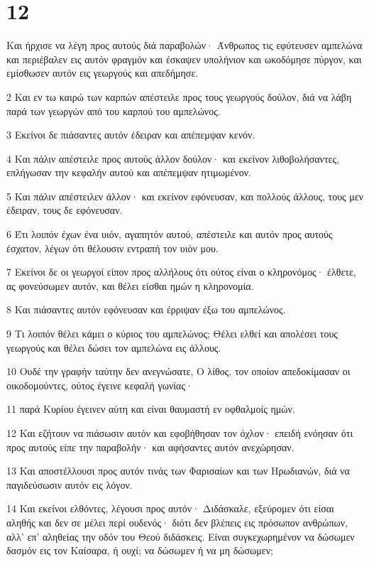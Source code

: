 \chapter{12}

\par Και ήρχισε να λέγη προς αυτούς διά παραβολών· Άνθρωπος τις εφύτευσεν αμπελώνα και περιέβαλεν εις αυτόν φραγμόν και έσκαψεν υπολήνιον και ωκοδόμησε πύργον, και εμίσθωσεν αυτόν εις γεωργούς και απεδήμησε.
\par 2 Και εν τω καιρώ των καρπών απέστειλε προς τους γεωργούς δούλον, διά να λάβη παρά των γεωργών από του καρπού του αμπελώνος.
\par 3 Εκείνοι δε πιάσαντες αυτόν έδειραν και απέπεμψαν κενόν.
\par 4 Και πάλιν απέστειλε προς αυτούς άλλον δούλον· και εκείνον λιθοβολήσαντες, επλήγωσαν την κεφαλήν αυτού και απέπεμψαν ητιμωμένον.
\par 5 Και πάλιν απέστειλεν άλλον· και εκείνον εφόνευσαν, και πολλούς άλλους, τους μεν έδειραν, τους δε εφόνευσαν.
\par 6 Έτι λοιπόν έχων ένα υιόν, αγαπητόν αυτού, απέστειλε και αυτόν προς αυτούς έσχατον, λέγων ότι θέλουσιν εντραπή τον υιόν μου.
\par 7 Εκείνοι δε οι γεωργοί είπον προς αλλήλους ότι ούτος είναι ο κληρονόμος· έλθετε, ας φονεύσωμεν αυτόν, και θέλει είσθαι ημών η κληρονομία.
\par 8 Και πιάσαντες αυτόν εφόνευσαν και έρριψαν έξω του αμπελώνος.
\par 9 Τι λοιπόν θέλει κάμει ο κύριος του αμπελώνος; Θέλει ελθεί και απολέσει τους γεωργούς και θέλει δώσει τον αμπελώνα εις άλλους.
\par 10 Ουδέ την γραφήν ταύτην δεν ανεγνώσατε, Ο λίθος, τον οποίον απεδοκίμασαν οι οικοδομούντες, ούτος έγεινε κεφαλή γωνίας·
\par 11 παρά Κυρίου έγεινεν αύτη και είναι θαυμαστή εν οφθαλμοίς ημών.
\par 12 Και εζήτουν να πιάσωσιν αυτόν και εφοβήθησαν τον όχλον· επειδή ενόησαν ότι προς αυτούς είπε την παραβολήν· και αφήσαντες αυτόν ανεχώρησαν.
\par 13 Και αποστέλλουσι προς αυτόν τινάς των Φαρισαίων και των Ηρωδιανών, διά να παγιδεύσωσιν αυτόν εις λόγον.
\par 14 Και εκείνοι ελθόντες, λέγουσι προς αυτόν· Διδάσκαλε, εξεύρομεν ότι είσαι αληθής και δεν σε μέλει περί ουδενός· διότι δεν βλέπεις εις πρόσωπον ανθρώπων, αλλ' επ' αληθείας την οδόν του Θεού διδάσκεις. Είναι συγκεχωρημένον να δώσωμεν δασμόν εις τον Καίσαρα, ή ουχί; να δώσωμεν ή να μη δώσωμεν;
